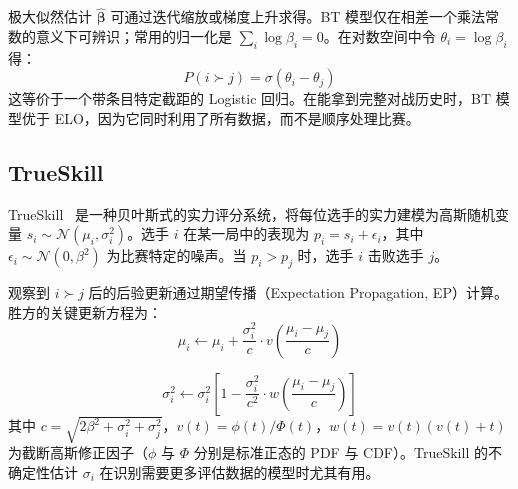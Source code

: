 极大似然估计 $\hat{\boldsymbol{\beta}}$ 可通过迭代缩放或梯度上升求得。BT 模型仅在相差一个乘法常数的意义下可辨识；常用的归一化是 $\sum_i \log \beta_i = 0$。在对数空间中令 $\theta_i = \log \beta_i$ 得：
\begin{equation}
    P(i \succ j) = \sigma(\theta_i - \theta_j)
\end{equation}
这等价于一个带条目特定截距的 Logistic 回归。在能拿到完整对战历史时，BT 模型优于 ELO，因为它同时利用了所有数据，而不是顺序处理比赛。

\subsection{TrueSkill}
\label{trueskill}

TrueSkill~\cite{herbrich2006trueskill} 是一种贝叶斯式的实力评分系统，将每位选手的实力建模为高斯随机变量 $s_i \sim \mathcal{N}(\mu_i, \sigma_i^2)$。选手 $i$ 在某一局中的表现为 $p_i = s_i + \epsilon_i$，其中 $\epsilon_i \sim \mathcal{N}(0, \beta^2)$ 为比赛特定的噪声。当 $p_i > p_j$ 时，选手 $i$ 击败选手 $j$。

观察到 $i \succ j$ 后的后验更新通过期望传播（Expectation Propagation, EP）计算。胜方的关键更新方程为：
\begin{equation}
    \mu_i \leftarrow \mu_i + \frac{\sigma_i^2}{c} \cdot v\!\left(\frac{\mu_i - \mu_j}{c}\right)
\end{equation}

\begin{equation}
    \sigma_i^2 \leftarrow \sigma_i^2 \left[1 - \frac{\sigma_i^2}{c^2} \cdot w\!\left(\frac{\mu_i - \mu_j}{c}\right)\right]
\end{equation}
其中 $c = \sqrt{2\beta^2 + \sigma_i^2 + \sigma_j^2}$，$v(t) = \phi(t)/\Phi(t)$，$w(t) = v(t)(v(t) + t)$ 为截断高斯修正因子（$\phi$ 与 $\Phi$ 分别是标准正态的 PDF 与 CDF）。TrueSkill 的不确定性估计 $\sigma_i$ 在识别需要更多评估数据的模型时尤其有用。


